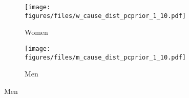 \begin{figure}[htp]
\caption{Posterior Distribution $exp(\beta_{\text{Mob}})$ and $exp(\beta{\text{Gini}})$ \newline by Cause of Death and Gender}
\centering

  \begin{subfigure}[b]{.80\linewidth}
    \centering
       \caption{Women}
    \texttt{[image: figures/files/w\_cause\_dist\_pcprior\_1\_10.pdf]}
  \end{subfigure}%

 \begin{subfigure}[b]{.80\linewidth}
   \caption{Men}
    \centering
    \texttt{[image: figures/files/m\_cause\_dist\_pcprior\_1\_10.pdf]}
  \end{subfigure}%
  \label{fig:cause_of_death}
\end{figure}
